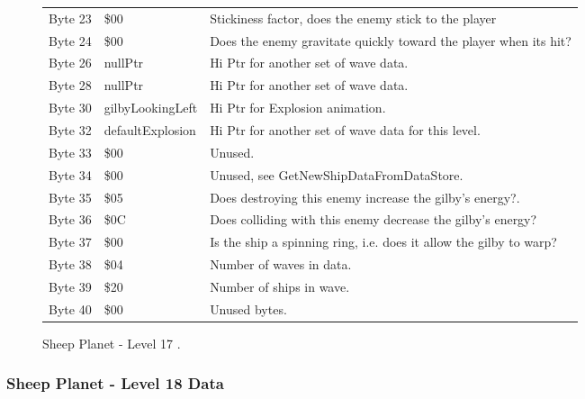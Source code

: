 \begin{figure}[H]
{\begin{adjustbox}{width=12cm}
\begin{tabular}{lll}
 Byte 23 & \$00                        & Stickiness factor, does the enemy stick to the player              \\
 Byte 24 & \$00                        & Does the enemy gravitate quickly toward the player when its hit?   \\
 Byte 26 & nullPtr                    & Hi Ptr for another set of wave data.                               \\
 Byte 28 & nullPtr                    & Hi Ptr for another set of wave data.                               \\
 Byte 30 & gilbyLookingLeft           & Hi Ptr for Explosion animation.                                    \\
 Byte 32 & defaultExplosion           & Hi Ptr for another set of wave data for this level.                \\
 Byte 33 & \$00                        & Unused.                                                            \\
 Byte 34 & \$00                        & Unused, see GetNewShipDataFromDataStore.                           \\
 Byte 35 & \$05                        & Does destroying this enemy increase the gilby's energy?.           \\
 Byte 36 & \$0C                        & Does colliding with this enemy decrease the gilby's energy?        \\
 Byte 37 & \$00                        & Is the ship a spinning ring, i.e. does it allow the gilby to warp? \\
 Byte 38 & \$04                        & Number of waves in data.                                           \\
 Byte 39 & \$20                        & Number of ships in wave.                                           \\
 Byte 40 & \$00                        & Unused bytes.                                                      \\
\bottomrule
\end{tabular}

  \end{adjustbox}

  }\caption*{Sheep Planet - Level 17
.}
\end{figure}

\clearpage
\subsubsection{Sheep Planet - Level 18 Data}

